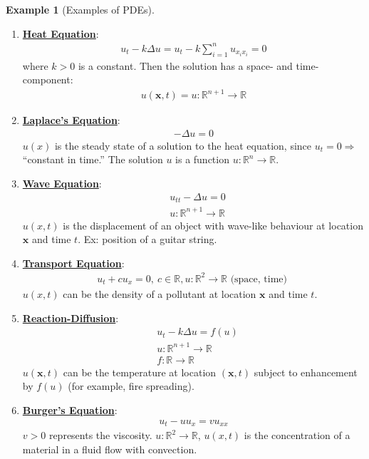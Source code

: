\documentclass[11pt]{scrartcl}
\theoremstyle{definition}
\newtheorem{ex}{Example}
\theoremstyle{remark}
\newcommand{\dfn}[1]{\textbf{\underline{#1}}}
\newcommand{\vect}[1]{\mathbf{#1}}
\newcommand{\R}[0]{\mathbb{R}}
\begin{document}
\begin{ex}[Examples of PDEs] 
	\begin{enumerate}[noitemsep]
		\item \dfn{Heat Equation}: 
		\begin{align}
				u_t - k \Delta u = u_t - k \sum_{i=1}^n u_{x_i x_i} = 0 
		\end{align}
		where $k > 0$ is a constant. Then the solution has a space- and time- component: 
		\begin{align}
			u(\vect{x}, t) = u: \R^{n+1} \rightarrow \R 
		\end{align}
	\item \dfn{Laplace's Equation}: 
	\begin{align}
			- \Delta u = 0 
	\end{align}
	$u(x)$ is the steady state of a solution to the heat equation, since $u_t = 0 \Rightarrow$ ``constant in time.'' The solution $u$ is a function $u: \R^n \rightarrow \R$. 
	\item \dfn{Wave Equation}: 
	\begin{align*}
		& u_{tt} - \Delta u = 0 \\
		& u: \R^{n+1} \rightarrow \R 
	\end{align*}
	$u(x,t)$ is the displacement of an object with wave-like behaviour at location $\vect{x}$ and time $t$. Ex: position of a guitar string. 
	\item \dfn{Transport Equation}: 
	\begin{align*} 
		u_t + cu_x = 0,\ c \in \R, u: \R^2 \rightarrow \R \text{ (space, time) } 
	\end{align*} 
	$u(x,t)$ can be the density of a pollutant at location $\vect{x}$ and time $t$. 
	\item  \dfn{Reaction-Diffusion}: 
	\begin{align*}
		& u_t - k \Delta u = f(u) \\
		& u: \R^{n+1} \rightarrow \R \\
		& f: \R \rightarrow \R 	
	\end{align*}
	$u( \vect{x},t)$ can be the temperature at location $(\vect{x}, t)$ subject to enhancement by $f(u)$ (for example, fire spreading). 
	\item \dfn{Burger's Equation}: 
	\begin{align}
		u_t - u u_x = vu_{xx} 
	\end{align}
	$v > 0$ represents the viscosity. $u: \R^2 \rightarrow \R$, $u(x,t)$ is the concentration of a material in a fluid flow with convection. 
	\end{enumerate}	
\end{ex}
\end{document}
